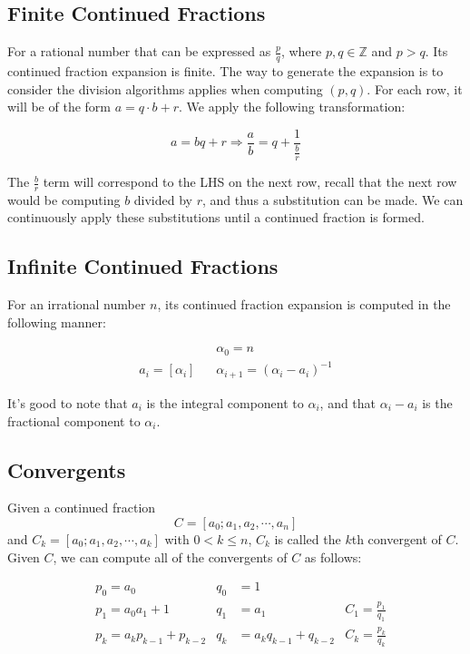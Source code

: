 \documentclass{article}
\begin{document}
\begin{multicols*}{2}
\subsection*{Finite Continued Fractions}

For a rational number that can be expressed as $\frac{p}{q}$, where $p,q \in \mathbb{Z}$ and $p > q$. Its continued fraction expansion is finite. The way to generate the expansion is to consider the division algorithms applies when computing $(p, q)$. For each row, it will be of the form $a = q\cdot b + r$. We apply the following transformation:

\[a = bq + r \Rightarrow \frac{a}{b} = q + \frac{1}{\frac{b}{r}}\]

The $\frac{b}{r}$ term will correspond to the LHS on the next row, recall that the next row would be computing $b$ divided by $r$, and thus a substitution can be made. We can continuously apply these substitutions until a continued fraction is formed.

\subsection*{Infinite Continued Fractions}

For an irrational number $n$, its continued fraction expansion is computed in the following manner:

\[
\begin{aligned}
&\;\;\; \alpha_0 = n \\
a_i = [\alpha_i] &\;\;\; \alpha_{i+1} = (\alpha_i - a_i)^{-1}
\end{aligned}
\]

It's good to note that $a_i$ is the integral component to $\alpha_i$, and that $\alpha_i - a_i$ is the fractional component to $\alpha_i$.

\subsection*{Convergents}

Given a continued fraction \[C = [a_0;a_1,a_2,\cdots,a_n]\] and $C_k = [a_0;a_1,a_2,\cdots,a_k]$ with $0 < k \leq n$, $C_k$ is called the $k$th convergent of $C$. Given $C$, we can compute all of the convergents of $C$ as follows:

\[
\begin{aligned}
& p_0 = a_0 & q_0 &= 1 &\\
& p_1 = a_0a_1+1 & q_1 &= a_1 & C_1 = \frac{p_1}{q_1}\\
& p_k = a_kp_{k-1}+p_{k-2}& q_k &= a_kq_{k-1}+q_{k-2} & C_k = \frac{p_k}{q_k}
\end{aligned}
\]


\end{multicols*}
\end{document}
